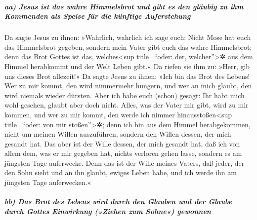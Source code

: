 \hypertarget{aa-jesus-ist-das-wahre-himmelsbrot-und-gibt-es-den-gluxe4ubig-zu-ihm-kommenden-als-speise-fuxfcr-die-kuxfcnftige-auferstehung}{%
\subparagraph{aa) Jesus ist das wahre Himmelsbrot und gibt es den
gläubig zu ihm Kommenden als Speise für die künftige
Auferstehung}\label{aa-jesus-ist-das-wahre-himmelsbrot-und-gibt-es-den-gluxe4ubig-zu-ihm-kommenden-als-speise-fuxfcr-die-kuxfcnftige-auferstehung}}

 Da sagte Jesus zu ihnen: »Wahrlich, wahrlich ich sage
euch: Nicht Mose hat euch das Himmelsbrot gegeben, sondern mein Vater
gibt euch das wahre Himmelsbrot;  denn das Brot Gottes
ist das, welches\textless sup title=``oder: der, welcher''\textgreater✲
aus dem Himmel herabkommt und der Welt Leben gibt.«  Da
riefen sie ihm zu: »Herr, gib uns dieses Brot allezeit!« 
Da sagte Jesus zu ihnen: »Ich bin das Brot des Lebens! Wer zu mir kommt,
den wird nimmermehr hungern, und wer an mich glaubt, den wird niemals
wieder dürsten.  Aber ich habe euch (schon) gesagt: Ihr
habt mich wohl gesehen, glaubt aber doch nicht.  Alles,
was der Vater mir gibt, wird zu mir kommen, und wer zu mir kommt, den
werde ich nimmer hinausstoßen\textless sup title=``oder: von mir
stoßen''\textgreater✲;  denn ich bin aus dem Himmel
herabgekommen, nicht um meinen Willen auszuführen, sondern den Willen
dessen, der mich gesandt hat.  Das aber ist der Wille
dessen, der mich gesandt hat, daß ich von allem dem, was er mir gegeben
hat, nichts verloren gehen lasse, sondern es am jüngsten Tage
auferwecke.  Denn das ist der Wille meines Vaters, daß
jeder, der den Sohn sieht und an ihn glaubt, ewiges Leben habe, und ich
werde ihn am jüngsten Tage auferwecken.«

\hypertarget{bb-das-brot-des-lebens-wird-durch-den-glauben-und-der-glaube-durch-gottes-einwirkung-ziehen-zum-sohne-gewonnen}{%
\subparagraph{bb) Das Brot des Lebens wird durch den Glauben und der
Glaube durch Gottes Einwirkung (»Ziehen zum Sohne«)
gewonnen}\label{bb-das-brot-des-lebens-wird-durch-den-glauben-und-der-glaube-durch-gottes-einwirkung-ziehen-zum-sohne-gewonnen}}

